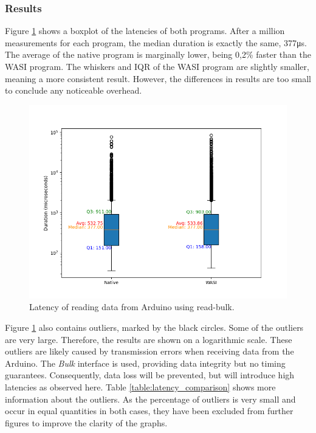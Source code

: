 \subsubsection{Results}
Figure \ref{fig:arduino_reading_latency_boxplot} shows a boxplot of the latencies of both programs. After a million measurements for each program, the median duration is exactly the same, 377μs. The average of the native program is marginally lower, being 0,2\% faster than the \acrshort{WASI} program. The whiskers and IQR of the \acrshort{WASI} program are slightly smaller, meaning a more consistent result. However, the differences in results are too small to conclude any noticeable overhead.

\begin{figure}[H]
  \centering
  \includegraphics[width=1\textwidth]{images/arduino_latency_boxplot.png}
  \caption{Latency of reading data from Arduino using read-bulk.}
  \label{fig:arduino_reading_latency_boxplot}
\end{figure}


Figure \ref{fig:arduino_reading_latency_boxplot} also contains outliers, marked by the black circles. Some of the outliers are very large. Therefore, the results are shown on a logarithmic scale. These outliers are likely caused by transmission errors when receiving data from the Arduino. The \textit{Bulk} interface is used, providing data integrity but no timing guarantees. Consequently, data loss will be prevented, but will introduce high latencies as observed here. Table \ref{table:latency_comparison} shows more information about the outliers. As the percentage of outliers is very small and occur in equal quantities in both cases, they have been excluded from further figures to improve the clarity of the graphs.

